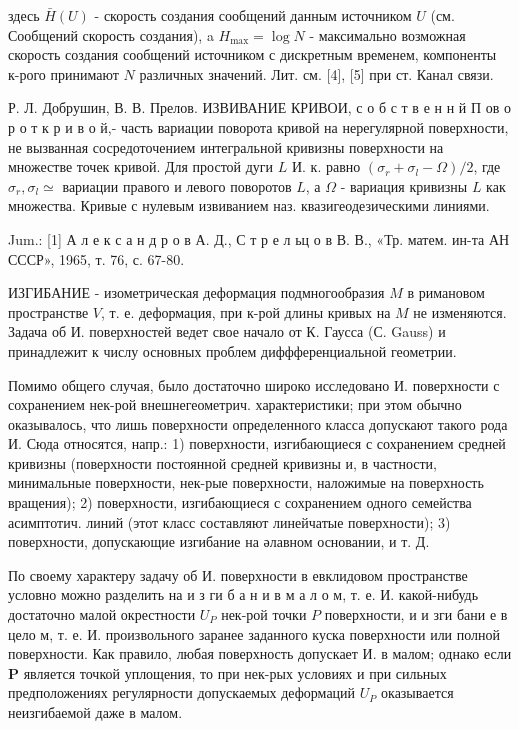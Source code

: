 \documentclass[10pt]{article}
\begin{document}
здесь $\bar{H}(U)$ - скорость создания сообщений данным источником $U$ (см. Сообщений скорость создания), a $H_{\max }=\log N$ - максимально возможная скорость создания сообщений источником с дискретным временем, компоненты к-рого принимают $N$ различных значений. Лит. см. [4], [5] при ст. Канал связи.



Р. Л. Добрушин, В. В. Прелов. ИЗВИВАНИЕ КРИВОИ, с о б с т в е н н й П ов о р о т к р и в о й,- часть вариации поворота кривой на нерегулярной поверхности, не вызванная сосредоточением интегральной кривизны поверхности на множестве точек кривой. Для простой дуги $L$ И. к. равно $\left(\sigma_{r}+\sigma_{l}-\Omega\right) / 2$, где $\sigma_{r}, \sigma_{l} \simeq$ вариации правого и левого поворотов $L$, а $\Omega$ - вариация кривизны $L$ как множества. Кривые с нулевым извиванием наз. квазигеодезическими линиями.



Jum.: [1] А л е к с а н д р о в А. Д., С т р е л ьц о в В. В., «Тр. матем. ин-та АН СССР», 1965, т. 76, с. 67-80.



ИЗГИБАНИЕ - изометрическая деформация подмногообразия $M$ в римановом пространстве $V$, т. е. деформация, при к-рой длины кривых на $M$ не изменяются. Задача об И. поверхностей ведет свое начало от К. Гаусса (С. Gauss) и принадлежит к числу основных проблем диффференциальной геометрии.



Помимо общего случая, было достаточно широко исследовано И. поверхности с сохранением нек-рой внешнегеометрич. характеристики; при этом обычно оказывалось, что лишь поверхности определенного класса допускают такого рода И. Сюда относятся, напр.: 1) поверхности, изгибающиеся с сохранением средней кривизны (поверхности постоянной средней кривизны и, в частности, минимальные поверхности, нек-рые поверхности, наложимые на поверхность вращения); 2) поверхности, изгибающиеся с сохранением одного семейства асимптотич. линий (этот класс составляют линейчатые поверхности); 3) поверхности, допускающие изгибание на әлавном основании, и т. Д.



По своему характеру задачу об И. поверхности в евклидовом пространстве условно можно разделить на и з ги б а н и в м а л о м, т. е. И. какой-нибудь достаточно малой окрестности $U_{P}$ нек-рой точки $P$ поверхности, и и зги бани е в цело м, т. е. И. произвольного заранее заданного куска поверхности или полной поверхности. Как правило, любая поверхность допускает И. в малом; однако если $\boldsymbol{P}$ является точкой уплощения, то при нек-рых условиях и при сильных предположениях регулярности допускаемых деформаций $U_{P}$ оказывается неизгибаемой даже в малом.
\end{document}
